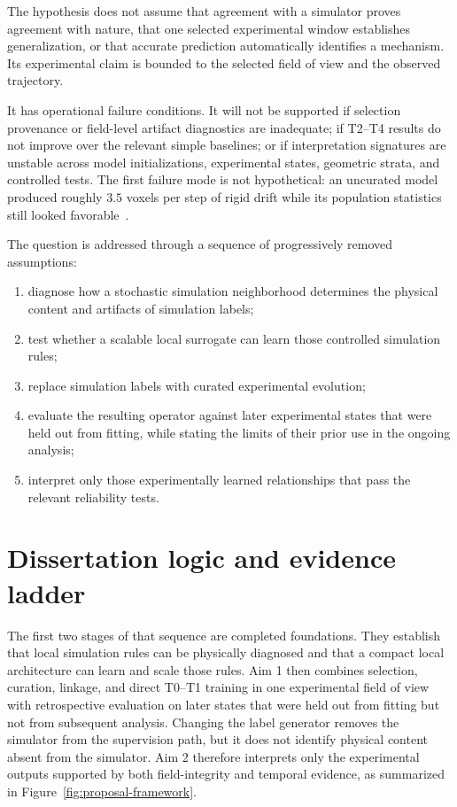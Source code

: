 \documentclass[proposalMode]{ufdissertation}
\begin{document}
The hypothesis does not assume that agreement with a simulator proves agreement with nature, that one selected experimental window establishes generalization, or that accurate prediction automatically identifies a mechanism. Its experimental claim is bounded to the selected field of view and the observed trajectory.

It has operational failure conditions. It will not be supported if selection provenance or field-level artifact diagnostics are inadequate; if T2--T4 results do not improve over the relevant simple baselines; or if interpretation signatures are unstable across model initializations, experimental states, geometric strata, and controlled tests. The first failure mode is not hypothetical: an uncurated model produced roughly \(3.5\) voxels per step of rigid drift while its population statistics still looked favorable~\cite{tian2026experiment}.

The question is addressed through a sequence of progressively removed assumptions:

\begin{enumerate}

\item diagnose how a stochastic simulation neighborhood determines the physical content and artifacts of simulation labels;

\item test whether a scalable local surrogate can learn those controlled simulation rules;

\item replace simulation labels with curated experimental evolution;

\item evaluate the resulting operator against later experimental states that were held out from fitting, while stating the limits of their prior use in the ongoing analysis;

\item interpret only those experimentally learned relationships that pass the relevant reliability tests.

\end{enumerate}

\section{Dissertation logic and evidence ladder}

The first two stages of that sequence are completed foundations. They establish that local simulation rules can be physically diagnosed and that a compact local architecture can learn and scale those rules. Aim 1 then combines selection, curation, linkage, and direct T0--T1 training in one experimental field of view with retrospective evaluation on later states that were held out from fitting but not from subsequent analysis. Changing the label generator removes the simulator from the supervision path, but it does not identify physical content absent from the simulator. Aim 2 therefore interprets only the experimental outputs supported by both field-integrity and temporal evidence, as summarized in Figure~\ref{fig:proposal-framework}.
\end{document}
